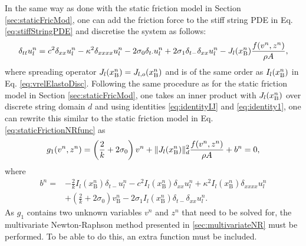 In the same way as done with the static friction model in Section \ref{sec:staticFricMod}, one can add the friction force to the stiff string PDE in Eq. \eqref{eq:stiffStringPDE} and discretise the system as follows:
%
\begin{equation}\label{eq:elastoStiffStringFDS}
    \delta_{tt} u_l^n = c^2 \delta_{xx} u_l^n - \kappa^2 \delta_{xxxx} u_l^n - 2 \sigma_{0} \delta_{t\cdot} u_l^n + 2 \sigma_{1}\delta_{t-}\delta_{xx} u_l^n - J_l(x_{\text{B}}^n)\frac{f(v^n,z^n)}{\rho A},
\end{equation}
where spreading operator $J_l(x_{\text{B}}^n) = J_{l,o}(x_{\text{B}}^n)$ and is of the same order as $I_l(x_{\text{B}}^n)$ in Eq. \eqref{eq:vrelElastoDisc}. Following the same procedure as for the static friction model in Section \ref{sec:staticFricMod}, one takes an inner product with $J_l(x_{\text{B}}^n)$ over discrete string domain $d$ and using identities \eqref{eq:identityIJ} and \eqref{eq:identity1}, one can rewrite this similar to the static friction model in Eq. \eqref{eq:staticFrictionNRfunc} as
%
\begin{equation}\label{eq:elastog1}
    g_1(v^n,z^n) = \left(\frac{2}{k} + 2\sigma_{0}\right)v^n + \lVert J_l(x_{\text{B}}^n)\rVert_d^2\frac{f(v^n,z^n)}{\rho A}+ b^n= 0,
\end{equation}
where
\begin{align*}
    b^n =&-\frac{2}{k}I_l(x_\text{B}^n)\delta_{t-}u_l^n - c^2 I_l(x_\text{B}^n)\delta_{xx} u_l^n +\kappa^2I_l(x_\text{B}^n)\delta_{xxxx} u_l^n\\
    &+\left(\frac{2}{k}+ 2\sigma_0\right)v_\text{B}^n-2\sigma_1I_l(x_\text{B}^n)\delta_{t-}\delta_{xx}u_l^n.
\end{align*}
As $g_1$ contains two unknown variables $v^n$ and $z^n$ that need to be solved for, the multivariate Newton-Raphson method presented in \ref{sec:multivariateNR} must be performed. To be able to do this, an extra function must be included. 

